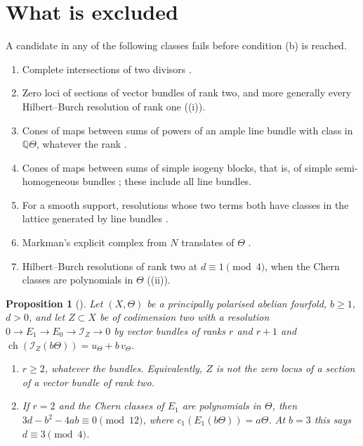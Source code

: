 \documentclass[11pt]{amsart}
\newtheorem{proposition}[theorem]{Proposition}
\theoremstyle{definition}
\theoremstyle{remark}
\newcommand{\QQ}{\mathbb{Q}}
\newcommand{\cI}{\mathcal{I}}
\newcommand{\ch}{\operatorname{ch}}
\begin{document}
\section{What is excluded}\label{sec:excluded}

A candidate in any of the following classes fails before condition (b) is
reached.
\begin{enumerate}[label=(\roman*),leftmargin=2.2em]
\item Complete intersections of two divisors \cite[Theorem~18.54]{BMB}.
\item Zero loci of sections of vector bundles of rank two, and more generally
  every Hilbert--Burch resolution of rank one ((i)).
\item Cones of maps between sums of powers of an ample line bundle with class
  in $\QQ\Theta$, whatever the rank \cite[Theorem~18.63,
  Corollary~18.68(i)]{BMB}.
\item Cones of maps between sums of simple isogeny blocks, that is, of simple
  semi-homogeneous bundles \cite[Theorem~18.66, Remark~18.67]{BMB}; these
  include all line bundles.
\item For a smooth support, resolutions whose two terms both have classes in
  the lattice generated by line bundles \cite[Corollary~18.58]{BMB}.
\item Markman's explicit complex from $N$ translates of $\Theta$
  \cite[Theorem~18.34]{BMB}.
\item Hilbert--Burch resolutions of rank two at $d\equiv1\pmod4$, when the
  Chern classes are polynomials in $\Theta$ ((ii)).
\end{enumerate}

\begin{proposition}[{\cite[Proposition~18.60]{BMB}}]\label{prop:lowrank}
Let $(X,\Theta)$ be a principally polarised abelian fourfold, $b\ge1$, $d>0$,
and let $Z\subset X$ be of codimension two with a resolution
$0\to E_{1}\to E_{0}\to\cI_{Z}\to0$ by vector bundles of ranks $r$ and $r+1$
and $\ch(\cI_{Z}(b\Theta))=u_{\Theta}+b\,v_{\Theta}$.
\begin{enumerate}[label=\textup{(\roman*)},nosep]
\item $r\ge2$, whatever the bundles. Equivalently, $Z$ is not the zero locus
  of a section of a vector bundle of rank two.
\item If $r=2$ and the Chern classes of $E_{1}$ are polynomials in $\Theta$,
  then $3d-b^{2}-4ab\equiv0\pmod{12}$, where
  $c_{1}(E_{1}(b\Theta))=a\Theta$. At $b=3$ this says $d\equiv3\pmod4$.
\end{enumerate}
\end{proposition}
\end{document}
